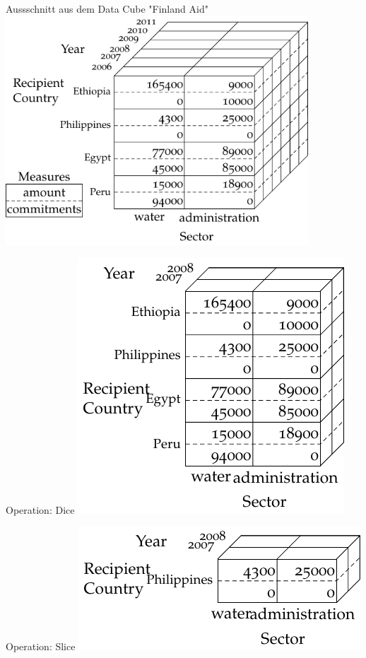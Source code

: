 \documentclass[14pt,aspectratio=1610]{beamer}
\begin{document}
\begin{frame}{Aussschnitt aus dem Data Cube "Finland Aid"}
\includegraphics[width=0.85\textwidth]{img/datacube-full.pdf}
\end{frame}

\begin{frame}{Operation: Dice}
\includegraphics[width=0.65\columnwidth]{img/datacube-dice.pdf}
\end{frame}

\begin{frame}{Operation: Slice}
\includegraphics[width=0.65\columnwidth]{img/datacube-slice.pdf}
\end{frame}
\end{document}
